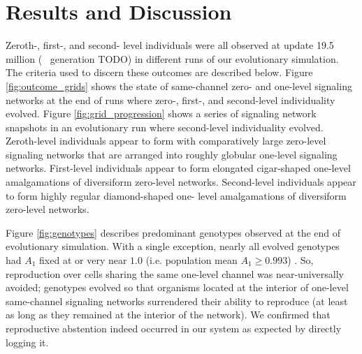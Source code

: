 \section{Results and Discussion}













Zeroth-, first-, and second- level individuals were all observed at update 19.5 million (~ generation TODO) in different runs of our evolutionary simulation.
The criteria used to discern these outcomes are described below.
Figure \ref{fig:outcome_grids} shows the state of same-channel zero- and one-level signaling networks at the end of runs where zero-, first-, and second-level individuality evolved.
Figure \ref{fig:grid_progression} shows a series of signaling network snapshots in an evolutionary run where second-level individuality evolved.
Zeroth-level individuals appear to form with comparatively large zero-level signaling networks that are arranged into roughly globular one-level signaling networks.
First-level individuals appear to form elongated cigar-shaped one-level amalgamations of diversiform zero-level networks.
Second-level individuals appear to form highly regular diamond-shaped one- level amalgamations of diversiform zero-level networks.

Figure \ref{fig:genotypes} describes predominant genotypes observed at the end of evolutionary simulation.
With a single exception, nearly all evolved genotypes had $A_1$ fixed at or very near $1.0$ (i.e. population mean $A_1 \geq 0.993$) .
So, reproduction over cells sharing the same one-level channel was near-universally avoided;
genotypes evolved so that organisms located at the interior of one-level same-channel signaling networks surrendered their ability to reproduce (at least as long as they remained at the interior of the network).
We confirmed that reproductive abstention indeed occurred in our system as expected by directly logging it.

